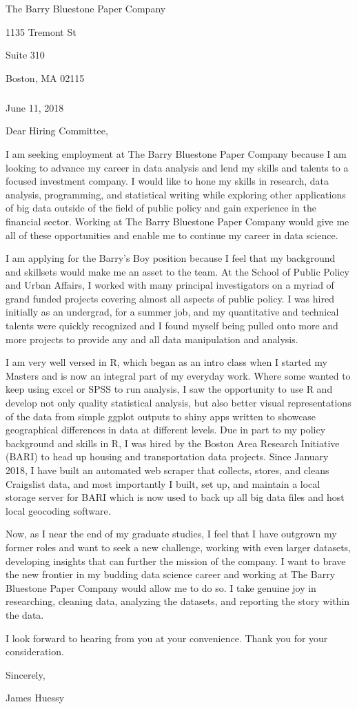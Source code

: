 \documentclass[]{article}
\title{}
\author{}
\date{}
\let\oldsubparagraph\subparagraph
\renewcommand{\subparagraph}[1]{\oldsubparagraph{#1}\mbox{}}
\begin{document}
The Barry Bluestone Paper Company

1135 Tremont St

Suite 310

Boston, MA 02115

\subparagraph{}\label{section}

June 11, 2018

Dear Hiring Committee,

I am seeking employment at The Barry Bluestone Paper Company because I
am looking to advance my career in data analysis and lend my skills and
talents to a focused investment company. I would like to hone my skills
in research, data analysis, programming, and statistical writing while
exploring other applications of big data outside of the field of public
policy and gain experience in the financial sector. Working at The Barry
Bluestone Paper Company would give me all of these opportunities and
enable me to continue my career in data science.

I am applying for the Barry's Boy position because I feel that my
background and skillsets would make me an asset to the team. At the
School of Public Policy and Urban Affairs, I worked with many principal
investigators on a myriad of grand funded projects covering almost all
aspects of public policy. I was hired initially as an undergrad, for a
summer job, and my quantitative and technical talents were quickly
recognized and I found myself being pulled onto more and more projects
to provide any and all data manipulation and analysis.

I am very well versed in R, which began as an intro class when I started
my Masters and is now an integral part of my everyday work. Where some
wanted to keep using excel or SPSS to run analysis, I saw the
opportunity to use R and develop not only quality statistical analysis,
but also better visual representations of the data from simple ggplot
outputs to shiny apps written to showcase geographical differences in
data at different levels. Due in part to my policy background and skills
in R, I was hired by the Boston Area Research Initiative (BARI) to head
up housing and transportation data projects. Since January 2018, I have
built an automated web scraper that collects, stores, and cleans
Craigslist data, and most importantly I built, set up, and maintain a
local storage server for BARI which is now used to back up all big data
files and host local geocoding software.

Now, as I near the end of my graduate studies, I feel that I have
outgrown my former roles and want to seek a new challenge, working with
even larger datasets, developing insights that can further the mission
of the company. I want to brave the new frontier in my budding data
science career and working at The Barry Bluestone Paper Company would
allow me to do so. I take genuine joy in researching, cleaning data,
analyzing the datasets, and reporting the story within the data.

I look forward to hearing from you at your convenience. Thank you for
your consideration.

Sincerely,

James Huessy
\end{document}
